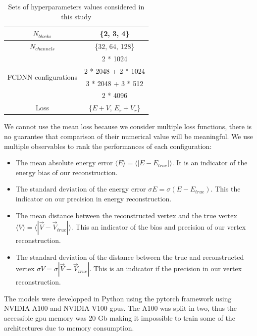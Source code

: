 \documentclass[../main.tex]{subfiles}
\begin{document}
\begin{table}[ht]
  \centering
  \begin{tabular}{ | c | c | }
    \hline $N_{blocks}$ & \{2, 3, 4\} \\
    \hline $N_{channels}$ & \{32, 64, 128\} \\
    \hline
    \multirow{4}{*}{FCDNN configurations} & 2 * 1024 \\
                                        & 2 * 2048 + 2 * 1024 \\
                                        & 3 * 2048 + 3 * 512 \\
                                        & 2 * 4096 \\
    \hline
    Loss & \{$E+V$, $E_r + V_r$\} \\
    \hline
  \end{tabular}
  \caption{Sets of hyperparameters values considered in this study}
  \label{tab:jcnn:hyper}
\end{table}

We cannot use the mean loss because we consider multiple loss functions, there is no guarantee that comparison of their numerical value will be meaningful. We use multiple observables to rank the performances of each configuration:
\begin{itemize}
  \item The mean absolute energy error $\langle E \rangle = \langle | E - E_{true} | \rangle$. It is an indicator of the energy bias of our reconstruction.
  \item The standard deviation of the energy error $\sigma E = \sigma (E - E_{true})$. This the indicator on our precision in energy reconstruction.
  \item The mean distance between the reconstructed vertex and the true vertex $\langle V \rangle = \langle | \vec{V} - \vec{V}_{true} | \rangle$. This an indicator of the bias and precision of our vertex reconstruction.
  \item The standard deviation of the distance between the true and reconstructed vertex $\sigma V = \sigma |\vec{V} - \vec{V}_{true}|$. This is an indicator if the precision in our vertex reconstruction.
\end{itemize}

The models were developped in Python using the pytorch framework \cite{ansel_pytorch_2024} using  NVIDIA A100 \cite{noauthor_nvidia_nodate-1} and NVIDIA V100 \cite{noauthor_nvidia_nodate-2} gpus. The A100 was split in two, thus the accessible gpu memory was 20 Gb making it impossible to train some of the architectures due to memory consumption.
\end{document}
